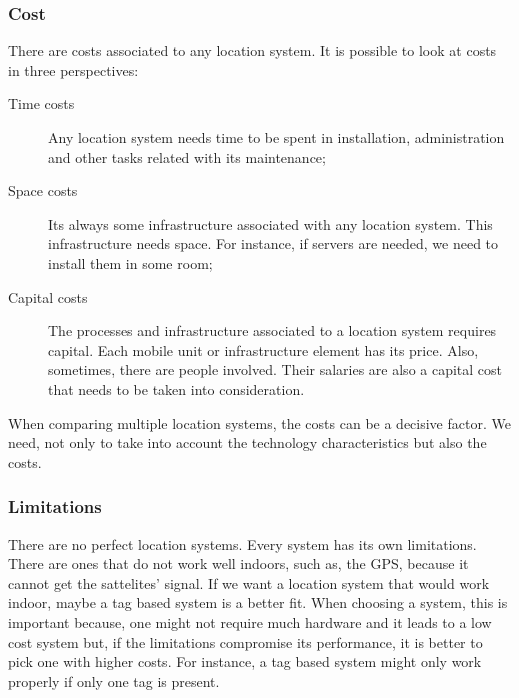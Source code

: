 \subsubsection{Cost}
\label{sub:background_cost}
There are costs associated to any location system.
It is possible to look at costs in three perspectives:
\begin{description}
  \item[Time costs] Any location system needs time to be spent in installation, administration and other tasks related with its maintenance;
  \item[Space costs] Its always some infrastructure associated with any location system. This infrastructure needs space. For instance, if servers are needed, we need to install them in some room;
  \item[Capital costs] The processes and infrastructure associated to a location system requires capital.
  Each mobile unit or infrastructure element has its price. Also, sometimes, there are people involved. Their salaries are also a capital cost that needs to be taken into consideration.
\end{description}

When comparing multiple location systems, the costs can be a decisive factor. We need, not only to take into account the technology characteristics but also the costs.

\subsubsection{Limitations}
\label{sub:background_limitations}
There are no perfect location systems. Every system has its own limitations.
There are ones that do not work well indoors, such as, the \gls{GPS}, because it cannot get the sattelites' signal.
If we want a location system that would work indoor, maybe a tag based system is a better fit.
When choosing a system, this is important because, one might not require much hardware and it leads to a low cost system but, if the limitations compromise its performance, it is better to pick one with higher costs.
For instance, a tag based system might only work properly if only one tag is present.


